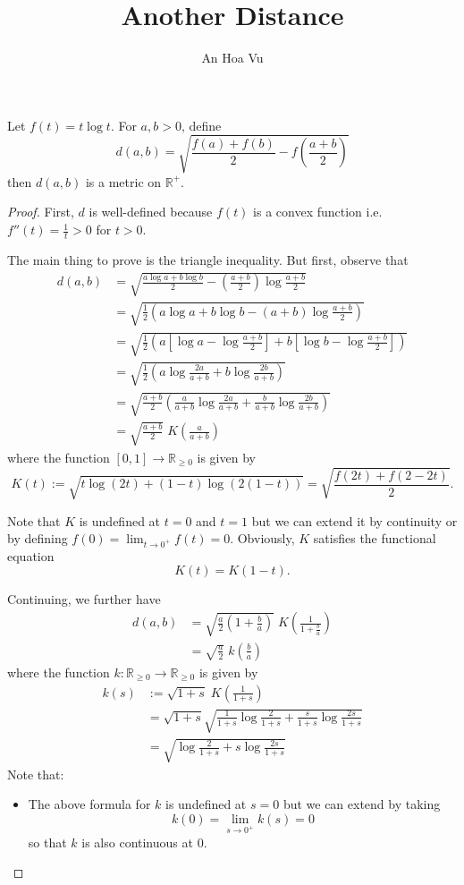 \documentclass[10pt]{amsart}
\title{Another Distance}
\author{An Hoa Vu}
\begin{document}
\maketitle

\newcommand{\R}{\mathbb{R}}

Let $f(t) = t \log t$. For $a, b > 0$, define
$$d(a, b) = \sqrt{\frac{f(a) + f(b)}{2} - f\left(\frac{a + b}{2}\right)}$$
then $d(a, b)$ is a metric on $\R^+$.

\begin{proof}
First, $d$ is well-defined because $f(t)$ is a convex function i.e. $f''(t) = \frac{1}{t} > 0$ for $t > 0$.

The main thing to prove is the triangle inequality. But first, observe that
\begin{align*}
d(a, b) &= \sqrt{\frac{a \log a + b \log b}{2} - \left(\frac{a + b}{2}\right) \log \frac{a + b}{2}}\\
&= \sqrt{\frac{1}{2} \left(a \log a + b \log b - (a + b) \log \frac{a + b}{2}\right)}\\
&= \sqrt{\frac{1}{2} \left(a \left[\log a - \log \frac{a + b}{2}\right] + b \left[\log b -\log \frac{a + b}{2}\right]\right)}\\
&= \sqrt{\frac{1}{2} \left(a \log \frac{2a}{a + b} + b \log \frac{2b}{a + b}\right)}\\
&= \sqrt{\frac{a + b}{2} \left( \frac{a}{a + b} \log \frac{2a}{a + b} + \frac{b}{a + b} \log \frac{2b}{a + b}\right)}\\
&= \sqrt{\frac{a + b}{2}} \; K\left(\frac{a}{a + b}\right)
\end{align*}
where the function $[0, 1] \rightarrow \R_{\geq 0}$ is given by
$$K(t) := \sqrt{t \log (2t) + (1-t) \log (2(1-t))} = \sqrt{\frac{f(2t) + f(2-2t)}{2}}.$$

Note that $K$ is undefined at $t = 0$ and $t = 1$ but we can extend it by continuity or by defining $f(0) = \lim_{t \rightarrow 0^+} f(t) = 0$. Obviously, $K$ satisfies the functional equation
$$K(t) = K(1-t).$$

Continuing, we further have
\begin{align*}
d(a, b) &= \sqrt{\frac{a}{2}\left(1 + \frac{b}{a}\right)} \; K\left(\frac{1}{1 + \frac{b}{a}}\right)\\
&= \sqrt{\frac{a}{2}} \; k\left(\frac{b}{a}\right)
\end{align*}
where the function $k : \R_{\geq 0} \rightarrow \R_{\geq 0}$ is given by
\begin{align*}
k(s) &:= \sqrt{1 + s} \; K\left(\frac{1}{1 + s}\right)\\
&= \sqrt{1 + s} \sqrt{\frac{1}{1 + s} \log \frac{2}{1 + s} + \frac{s}{1 + s} \log \frac{2s}{1 + s}}\\
&= \sqrt{\log \frac{2}{1 + s} + s \log \frac{2s}{1 + s}}
\end{align*}
Note that:
\begin{itemize}
\item The above formula for $k$ is undefined at $s = 0$ but we can extend by taking
$$k(0) = \lim_{s \rightarrow 0^+} k(s) = 0$$
so that $k$ is also continuous at $0$.


\end{itemize}
\end{proof}
\end{document}
